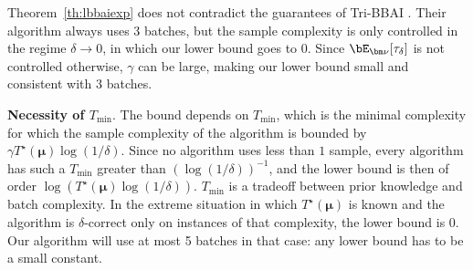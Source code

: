 Theorem~\ref{th:lbbaiexp} does not contradict the guarantees of Tri-BBAI \citep{jinOptimalBatchedBest2023}. 
Their algorithm always uses 3 batches, but the sample complexity is only controlled in the regime $\delta\rightarrow 0$, in which our lower bound goes to $0$.
Since $\bE_{\bm\nu}[\tau_\delta]$ is not controlled otherwise, $\gamma$ can be large, making our lower bound small and consistent with $3$ batches.

\textbf{Necessity of $T_{\min}$}. The bound depends on $T_{\min}$, which is the minimal complexity for which the sample complexity of the algorithm is bounded by $\gamma T^\star(\bm\mu)\log(1/\delta)$.
Since no algorithm uses less than $1$ sample, every algorithm has such a $T_{\min}$ greater than $(\log(1/\delta))^{-1}$, and the lower bound is then of order $\log (T^\star(\bm\mu) \log(1/\delta))$.
$T_{\min}$ is a tradeoff between prior knowledge and batch complexity.
In the extreme situation in which $T^\star(\bm\mu)$ is known and the algorithm is $\delta$-correct only on instances of that complexity, the lower bound is 0.
Our algorithm will use at most 5 batches in that case: any lower bound has to be a small constant.
